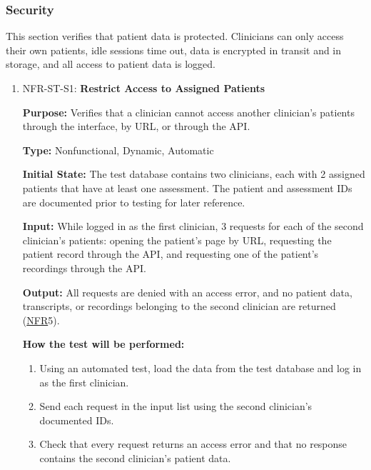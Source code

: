 \documentclass[12pt, titlepage]{article}
\newcommand{\srsnfr}[1]{\href{https://github.com/Nour-Fawaz/MacaBoca/blob/main/pdfs/SRS/SRS.pdf}{NFR}}
\renewcommand{\_}{\oldunderscore\allowbreak}
\begin{document}
\subsubsection{Security}
This section verifies that patient data is protected. Clinicians can only access their own patients, idle sessions time out, data is encrypted in transit and in storage, and all access to patient data is logged.
\begin{enumerate}
  \item NFR-ST-S1: \textbf{Restrict Access to Assigned Patients\\}
  \begin{mdframed}[linewidth=0.5mm]
      \textbf{Purpose:} Verifies that a clinician cannot access another clinician's patients through the interface, by URL, or through the API. \par
      \textbf{Type:} Nonfunctional, Dynamic, Automatic \par
      \textbf{Initial State:} The test database contains two clinicians, each with 2 assigned patients that have at least one assessment. The patient and assessment IDs are documented prior to testing for later reference. \par
      \textbf{Input:} While logged in as the first clinician, 3 requests for each of the second clinician's patients: opening the patient's page by URL, requesting the patient record through the API, and requesting one of the patient's recordings through the API. \par
      \textbf{Output:} All requests are denied with an access error, and no patient data, transcripts, or recordings belonging to the second clinician are returned (\srsnfr*{5}). \par
      \textbf{How the test will be performed:}
      \begin{enumerate}
      \item[1.] Using an automated test, load the data from the test database and log in as the first clinician.
      \item[2.] Send each request in the input list using the second clinician's documented IDs.
      \item[3.] Check that every request returns an access error and that no response contains the second clinician's patient data.
      \end{enumerate}
  \end{mdframed}


\end{enumerate}
\end{document}

